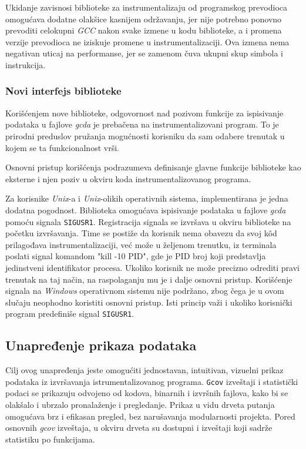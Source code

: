 \documentclass[12pt,oneside]{memoir}
\newcommand{\kod}[1]{\texttt{#1}}
\newcommand{\strano}[1]{\textit{#1}}
\begin{document}
Ukidanje zavisnosi biblioteke za instrumentalizaju od programskog prevodioca omogućava dodatne olakšice kasnijem održavanju, jer nije potrebno ponovno prevoditi celokupni \strano{GCC} nakon svake izmene u kodu biblioteke, a i promena verzije prevodioca ne iziskuje promene u instrumentalizaciji. Ova izmena nema negativan uticaj na performanse, jer se zamenom čuva ukupni skup simbola i instrukcija. 


\subsubsection{Novi interfejs biblioteke}


Korišćenjem nove biblioteke, odgovornost nad pozivom funkcije za ispisivanje podataka u fajlove \strano{gcda} je prebačena na instrumentalizovani program. To je prirodni preduslov pružanja mogućnosti korisniku da sam odabere trenutak u kojem se ta funkcionalnost vrši. 

Osnovni pristup korišćenja podrazumeva definisanje glavne funkcije biblioteke kao eksterne i njen poziv u okviru koda instrumentalizovanog programa. 

Za korisnike \strano{Unix}-a i \strano{Unix}-olikih operativnih sistema, implementirana je jedna dodatna pogodnost. Biblioteka omogućava ispisivanje podataka u fajlove \strano{gcda} pomoću signala \kod{SIGUSR1}. Registracija signala se izvršava u okviru biblioteke na početku izvršavanja. Time se postiže da korisnik nema obavezu da svoj k\^{o}d prilagođava instrumentalizaciji, već može u željenom trenutku, iz terminala poslati signal komandom "kill -10 PID", gde je PID broj koji predstavlja jedinstveni identifikator procesa. Ukoliko korisnik ne može precizno odrediti pravi trenutak na taj način, na raspolaganju mu je i dalje osnovni pristup. Korišćenje signala na \strano{Windows} operativnom sistemu nije podržano, zbog čega je u ovom slučaju neophodno koristiti osnovni pristup. Isti princip važi i ukoliko korisnički program predefiniše signal \kod{SIGUSR1}.


\subsection{Unapređenje prikaza podataka}


Cilj ovog unapređenja jeste omogućiti jednostavan, intuitivan, vizuelni prikaz podataka iz izvršavanja istrumentalizovanog programa. \kod{Gcov} izveštaji i statistički podaci se prikazuju odvojeno od kodova, binarnih i izvršnih fajlova, kako bi se olakšalo i ubrzalo pronalaženje i pregledanje. Prikaz u vidu drveta putanja omogućava brz i efikasan pregled, bez narušavanja modularnosti projekta. Pored osnovnih \strano{gcov} izveštaja, u okviru drveta su dostupni i izveštaji koji sadrže statistiku po funkcijama. 
\end{document}
